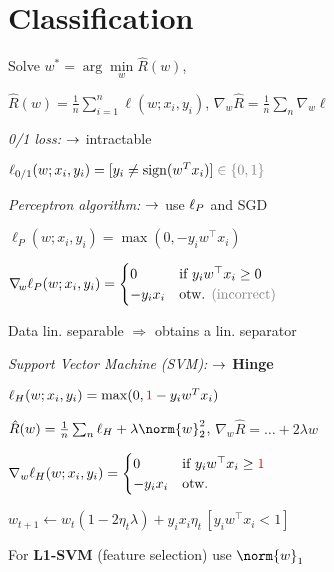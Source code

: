 \section{Classification}

Solve $w^* = \arg\min\limits_w \hat R(w)$, 

$\hat R(w) = \frac{1}{n} \sum_{i=1}^n \ell(w;x_i,y_i)$, \enskip $\nabla\!_w \hat R = \frac{1}{n} \sum_n \nabla\!_w \ell$%

\emph{0/1 loss:}
$\normalcolor\to$ intractable

$\ell_{0/1} (w;x_i,y_i) = [y_i \neq \operatorname{sign}(w^Tx_i)] \color{gray}\in \{0,1\}$

\emph{Perceptron algorithm:}
$\normalcolor\to$ use $\normalcolor\ell_P$ and SGD

$\ell_P (w;x_i,y_i) = \max(0, -y_i w^\top x_i)$


$\nabla\!_w \ell_P(w;x_i,y_i) = 
\begin{cases}
    0 &\text{if } y_i w^\top x_i \geq 0\\
    -y_i x_i &\text{otw. \color{gray}(incorrect)}
\end{cases}$

Data lin. separable $\Rightarrow$ obtains a lin. separator

\emph{Support Vector Machine (SVM):}
$\normalcolor\to$ \textbf{Hinge}

$\ell_H(w;x_i,y_i) = \max(0,{\color{red}1}-y_i w^T x_i)$

$\hat R(w) = \frac{1}{n}\sum_n \ell_H + \lambda\norm{w}_2^2$, \enskip $\nabla\!_w \hat R = \ldots + 2\lambda w$


$\nabla_w \ell_H(w;x_i,y_i) = 
\begin{cases}
    0 &\text{if } y_iw^\top x_i \geq {\color{red}1}\\
    -y_i x_i &\text{otw.}
\end{cases}$

$w_{t+1} \leftarrow w_t(1-2\eta_t\lambda) + y_ix_i\eta_t\,[y_iw^\top x_i < 1]$

For \textbf{L1-SVM} (feature selection) use $\norm{w}_1$ 
